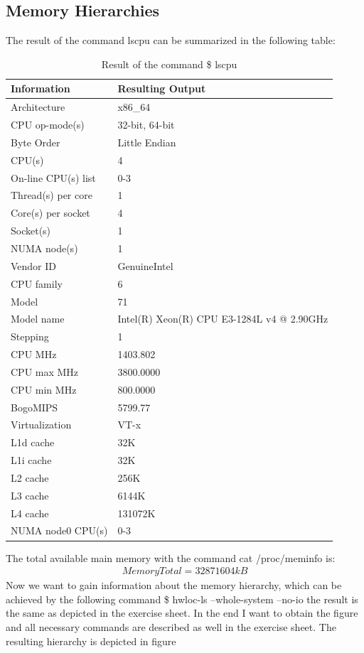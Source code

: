 \documentclass[unicode,11pt,a4paper,oneside,numbers=endperiod,openany]{scrartcl}
\begin{document}
\subsection{Memory Hierarchies}

The result of the command lscpu can be summarized in the following table:

\begin{table}[h]
    \centering
    \begin{tabular}{|l|l|}
      \hline
      \textbf{Information} & \textbf{Resulting Output} \\
      \hline
      Architecture & x86\_64 \\
      CPU op-mode(s) & 32-bit, 64-bit \\
      Byte Order & Little Endian \\
      CPU(s) & 4 \\
      On-line CPU(s) list & 0-3 \\
      Thread(s) per core & 1 \\
      Core(s) per socket & 4 \\
      Socket(s) & 1 \\
      NUMA node(s) & 1 \\
      Vendor ID & GenuineIntel \\
      CPU family & 6 \\
      Model & 71 \\
      Model name & Intel(R) Xeon(R) CPU E3-1284L v4 @ 2.90GHz \\
      Stepping & 1 \\
      CPU MHz & 1403.802 \\
      CPU max MHz & 3800.0000 \\
      CPU min MHz & 800.0000 \\
      BogoMIPS & 5799.77 \\
      Virtualization & VT-x \\
      L1d cache & 32K \\
      L1i cache & 32K \\
      L2 cache & 256K \\
      L3 cache & 6144K \\
      L4 cache & 131072K \\
      NUMA node0 CPU(s) & 0-3 \\
      \hline
    \end{tabular}
    \caption{Result of the command \$ lscpu}
    \label{tab:lscpu}
\end{table}

The total available main memory with the command cat /proc/meminfo 
is:
\begin{align*}
    MemoryTotal = 32871604 kB
\end{align*}
Now we want to gain information about the memory hierarchy, which can be achieved by the
following command \$ hwloc-ls --whole-system --no-io the result is the same as depicted in the exercise sheet.
In the end I want to obtain the figure and all necessary commands are described as well in the exercise sheet.
The resulting hierarchy is depicted in figure
\end{document}
